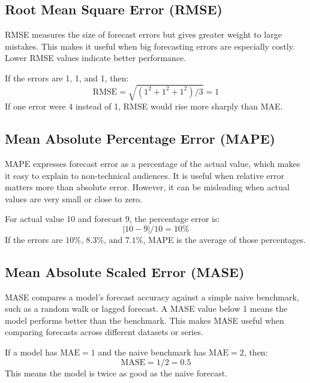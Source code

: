 \documentclass[12pt,a4paper]{article}
\begin{document}
\subsection{Root Mean Square Error (RMSE)}

RMSE measures the size of forecast errors but gives greater weight to large mistakes. This makes it useful when big forecasting errors are especially costly. Lower RMSE values indicate better performance.

\begin{example}
If the errors are 1, 1, and 1, then:
\[ \mathrm{RMSE} = \sqrt{(1^{2} + 1^{2} + 1^{2}) / 3} = 1 \]
If one error were 4 instead of 1, RMSE would rise more sharply than MAE.
\end{example}

\subsection{Mean Absolute Percentage Error (MAPE)}

MAPE expresses forecast error as a percentage of the actual value, which makes it easy to explain to non-technical audiences. It is useful when relative error matters more than absolute error. However, it can be misleading when actual values are very small or close to zero.

\begin{example}
For actual value 10 and forecast 9, the percentage error is:
\[ |10 - 9| / 10 = 10\% \]
If the errors are $10\%$, $8.3\%$, and $7.1\%$, MAPE is the average of those percentages.
\end{example}

\subsection{Mean Absolute Scaled Error (MASE)}

MASE compares a model's forecast accuracy against a simple naive benchmark, such as a random walk or lagged forecast. A MASE value below 1 means the model performs better than the benchmark. This makes MASE useful when comparing forecasts across different datasets or series.

\begin{example}
If a model has $\mathrm{MAE} = 1$ and the naive benchmark has $\mathrm{MAE} = 2$, then:
\[ \mathrm{MASE} = 1 / 2 = 0.5 \]
This means the model is twice as good as the naive forecast.
\end{example}
\end{document}
